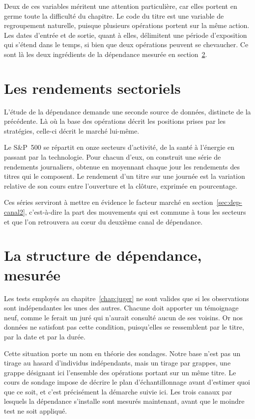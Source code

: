 Deux de ces variables méritent une attention particulière, car elles portent
en germe toute la difficulté du chapitre. Le code du titre est une variable de
regroupement naturelle, puisque plusieurs opérations portent sur la même
action. Les dates d'entrée et de sortie, quant à elles, délimitent une période
d'exposition qui s'étend dans le temps, si bien que deux opérations peuvent se
chevaucher. Ce sont là les deux ingrédients de la dépendance mesurée en
section~\ref{sec:dep-mesuree}.

\section{Les rendements sectoriels}
\label{sec:donnees-secteurs}

L'étude de la dépendance demande une seconde source de données, distincte de
la précédente. Là où la base des opérations décrit les positions prises par
les stratégies, celle-ci décrit le marché lui-même.

Le S\&P~500 se répartit en onze secteurs d'activité, de la santé à l'énergie
en passant par la technologie. Pour chacun d'eux, on construit une série de
rendements journaliers, obtenue en moyennant chaque jour les rendements des
titres qui le composent. Le rendement d'un titre sur une journée est la
variation relative de son cours entre l'ouverture et la clôture, exprimée en
pourcentage.

Ces séries serviront à mettre en évidence le facteur marché en
section~\ref{sec:dep-canal2}, c'est-à-dire la part des mouvements qui est
commune à tous les secteurs et que l'on retrouvera au cœur du deuxième canal
de dépendance.

\section{La structure de dépendance, mesurée}
\label{sec:dep-mesuree}

Les tests employés au chapitre~\ref{chap:juger} ne sont valides que si les
observations sont indépendantes les unes des autres. Chacune doit apporter un
témoignage neuf, comme le ferait un juré qui n'aurait consulté aucun de ses
voisins. Or nos données ne satisfont pas cette condition, puisqu'elles se
ressemblent par le titre, par la date et par la durée.

Cette situation porte un nom en théorie des sondages. Notre base n'est pas un
tirage au hasard d'individus indépendants, mais un tirage par grappes, une
grappe désignant ici l'ensemble des opérations portant sur un même titre. Le
cours de sondage impose de décrire le plan d'échantillonnage avant d'estimer
quoi que ce soit, et c'est précisément la démarche suivie ici. Les trois
canaux par lesquels la dépendance s'installe sont mesurés maintenant, avant
que le moindre test ne soit appliqué.

